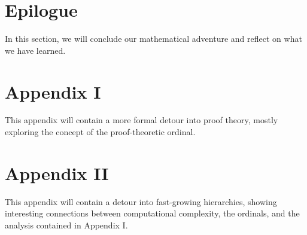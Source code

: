 \documentclass[10pt]{article}
\begin{document}
\section{Epilogue}
In this section, we will conclude our mathematical adventure and reflect on what we have learned.

\section{Appendix I}
This appendix will contain a more formal detour into proof theory, mostly exploring the concept of the proof-theoretic ordinal.

\section{Appendix II}
This appendix will contain a detour into fast-growing hierarchies, showing interesting connections between computational complexity, the ordinals, and the analysis contained in Appendix I.
\end{document}
